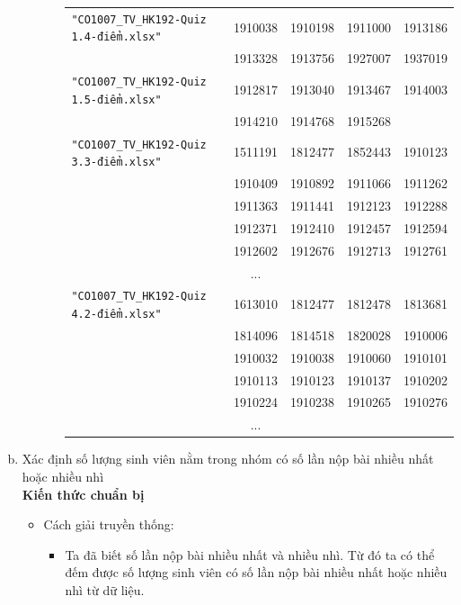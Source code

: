 \documentclass[a4paper]{article}
\theoremstyle{definition}
\begin{document}
\begin{enumerate}[a)]
\begin{itemize}
\begin{itemize}
            \begin{center}
                \begin{tabular}{l c c c c}
                     \texttt{"CO1007\_TV\_HK192-Quiz 1.4-điểm.xlsx"} & 1910038 & 1910198 & 1911000 & 1913186 \\ & 1913328 & 1913756 & 1927007 & 1937019\\
                     \texttt{"CO1007\_TV\_HK192-Quiz 1.5-điểm.xlsx"} & 1912817 & 1913040 & 1913467 & 1914003 \\ & 1914210 & 1914768 & 1915268\\
                     \texttt{"CO1007\_TV\_HK192-Quiz 3.3-điểm.xlsx"} & 1511191 & 1812477 & 1852443 & 1910123 \\ & 1910409 & 1910892 & 1911066 & 1911262 \\ & 1911363 & 1911441 & 1912123 & 1912288 \\ & 1912371 & 1912410 & 1912457 & 1912594 \\ & 1912602 & 1912676 & 1912713 & 1912761\\
                     & ...\\
                     \texttt{"CO1007\_TV\_HK192-Quiz 4.2-điểm.xlsx"} & 1613010 & 1812477 & 1812478 & 1813681 \\ & 1814096 & 1814518 & 1820028 & 1910006 \\ & 1910032 & 1910038 & 1910060 & 1910101 \\ & 1910113 & 1910123 & 1910137 & 1910202 \\ & 1910224 & 1910238 & 1910265 & 1910276\\
                     & ...
                \end{tabular}
            \end{center}
        \end{itemize}
    \end{itemize}
    \bf\item {Xác định số lượng sinh viên nằm trong nhóm có số lần nộp bài nhiều nhất hoặc nhiều nhì}\\[6pt]
    \bf Kiến thức chuẩn bị\normalfont
    \begin{itemize}
        \item Cách giải truyền thống:
        \begin{itemize}
            \item Ta đã biết số lần nộp bài nhiều nhất và nhiều nhì. Từ đó ta có thể đếm được số lượng sinh viên có số lần nộp bài nhiều nhất hoặc nhiều nhì từ dữ liệu.
        \end{itemize}

\end{itemize}
\end{enumerate}
\end{document}

